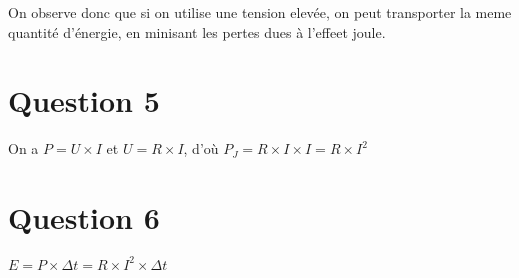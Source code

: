 \documentclass{scrartcl}
\begin{document}
    On observe donc que si on utilise une tension elevée, on peut transporter la meme quantité d'énergie, en minisant les pertes dues à l'effeet joule.

    \section*{Question 5}

    On a $P=U\times I$ \quad et \quad $U=R\times I$, \quad d'où \quad $P_J=R\times I\times I=R\times I^2$

    \section*{Question 6}

    $E=P\times\Delta t=R\times I^2\times\Delta t$
\end{document}
